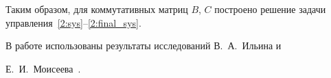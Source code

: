 




Таким образом, для коммутативных матриц $B$, $C$ построено решение задачи управления~\eqref{2:sys}--\eqref{2:final_sys}.

В работе использованы результаты исследований В.~А.~Ильина и 

Е.~И.~Моисеева~\cite{kozlova:bib:Ilyin0,kozlova:bib:Ilyin1}.



\pagebreak



